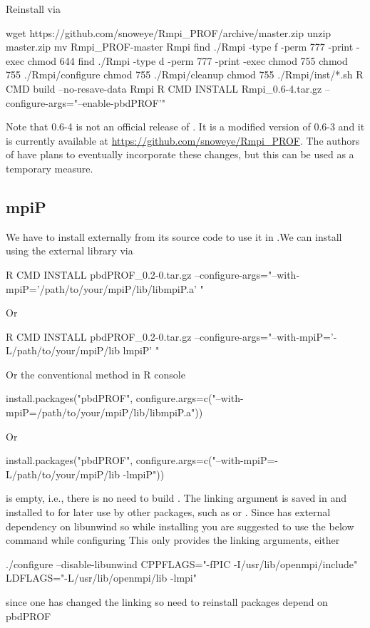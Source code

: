 Reinstall  via
\begin{Command}
wget https://github.com/snoweye/Rmpi_PROF/archive/master.zip
unzip master.zip
mv Rmpi_PROF-master Rmpi
find ./Rmpi -type f -perm 777 -print -exec chmod 644 {} \;
find ./Rmpi -type d -perm 777 -print -exec chmod 755 {} \;
chmod 755 ./Rmpi/configure
chmod 755 ./Rmpi/cleanup
chmod 755 ./Rmpi/inst/*.sh
R CMD build --no-resave-data Rmpi
R CMD INSTALL Rmpi_0.6-4.tar.gz --configure-args="--enable-pbdPROF'"
\end{Command}
Note that {\color{red} 0.6-4} is not an official release of .
It is a modified version of 0.6-3 and it is currently available at
\url{https://github.com/snoweye/Rmpi_PROF}.  The authors of  have plans 
to eventually incorporate these changes, but this can be used as a temporary 
measure.



\subsection{mpiP}
\label{sec:mpiP}

We have to install  externally from its source code to use it in
.We can install  using the external  library via
\begin{Command}
R CMD INSTALL pbdPROF_0.2-0.tar.gz --configure-args="--with-mpiP='/path/to/your/mpiP/lib/libmpiP.a' "
\end{Command}
Or
\begin{Command}
R CMD INSTALL pbdPROF_0.2-0.tar.gz --configure-args="--with-mpiP='-L/path/to/your/mpiP/lib lmpiP' "
\end{Command}
Or the conventional method in R console
\begin{Command}
install.packages("pbdPROF", configure.args=c("--with-mpiP=/path/to/your/mpiP/lib/libmpiP.a"))
\end{Command}
Or
\begin{Command}
install.packages("pbdPROF", configure.args=c("--with-mpiP=-L/path/to/your/mpiP/lib -lmpiP"))
\end{Command}


 is empty, i.e., there is no need to build .
The linking argument is saved in  and installed to
 for later use by other packages, such as  or .
Since  has external dependency  on libunwind so while installing 
 you are suggested to use the below command while configuring 
This only provides the linking arguments, either
\begin{Code}
./configure --disable-libunwind CPPFLAGS="-fPIC -I/usr/lib/openmpi/include" LDFLAGS="-L/usr/lib/openmpi/lib -lmpi"
\end{Code}
since one has changed the linking so need to reinstall packages depend on pbdPROF



